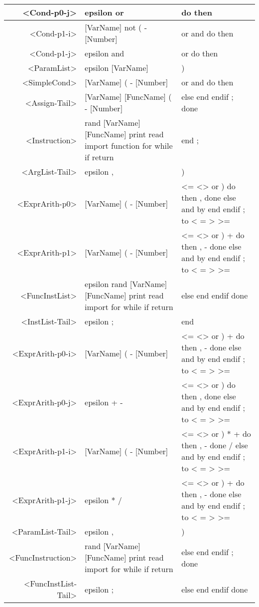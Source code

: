 \begin{longtable}{r p{7cm} p{7cm}}
<Cond-p0-j> & epsilon or  & do then \\ \hline
<Cond-p1-i> & [VarName] not ( - [Number]  & or and do then \\ \hline
<Cond-p1-j> & epsilon and  & or do then \\ \hline
<ParamList> & epsilon [VarName]  & ) \\ \hline
<SimpleCond> & [VarName] ( - [Number]  & or and do then \\ \hline
<Assign-Tail> & [VarName] [FuncName] ( - [Number]  & else end endif ; done \\ \hline
<Instruction> & rand [VarName] [FuncName] print read import function for while if return  & end ; \\ \hline
<ArgList-Tail> & epsilon ,  & ) \\ \hline
<ExprArith-p0> & [VarName] ( - [Number]  & <= <> or ) do then , done else and by end endif ; to < = > >= \\ \hline
<ExprArith-p1> & [VarName] ( - [Number]  & <= <> or ) + do then , - done else and by end endif ; to < = > >= \\ \hline
<FuncInstList> & epsilon rand [VarName] [FuncName] print read import for while if return  & else end endif done \\ \hline
<InstList-Tail> & epsilon ;  & end \\ \hline
<ExprArith-p0-i> & [VarName] ( - [Number]  & <= <> or ) + do then , - done else and by end endif ; to < = > >= \\ \hline
<ExprArith-p0-j> & epsilon + -  & <= <> or ) do then , done else and by end endif ; to < = > >= \\ \hline
<ExprArith-p1-i> & [VarName] ( - [Number]  & <= <> or ) * + do then , - done / else and by end endif ; to < = > >= \\ \hline
<ExprArith-p1-j> & epsilon * /  & <= <> or ) + do then , - done else and by end endif ; to < = > >= \\ \hline
<ParamList-Tail> & epsilon ,  & ) \\ \hline
<FuncInstruction> & rand [VarName] [FuncName] print read import for while if return  & else end endif ; done \\ \hline
<FuncInstList-Tail> & epsilon ;  & else end endif done 
\end{longtable}

